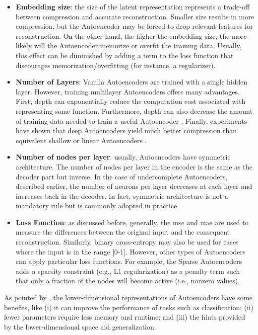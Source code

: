 \begin{itemize}
\item \textbf{Embedding size}: the size of the latent representation represents a trade-off between compression and accurate reconstruction. Smaller size results in more compression, but the Autoencoder may be forced to drop relevant features for reconstruction. On the other hand, the higher the embedding size, the more likely will the Autoencoder memorize or overfit the training data. Usually, this effect can be diminished by adding a term to the loss function that discourages memorization/overfitting (for instance, a regularizer).

\item \textbf{Number of Layers}: Vanilla Autoencoders are trained with a single hidden layer. However, training multilayer Autoencoders offers many advantages. First, depth can exponentially reduce the computation cost associated with representing some function. Furthermore, depth can also decrease the amount of training data needed to train a useful Autoencoder \citep[p.~506]{goodfellow2016deep}. Finally, experiments have shown that deep Autoencoders yield much better compression than equivalent shallow or linear Autoencoders \citep{hinton2006reducing}.

\item \textbf{Number of nodes per layer}: usually, Autoencoders have symmetric architecture. The number of nodes per layer in the encoder is the same as the decoder part but inverse. In the case of undercomplete Autoencoders, described earlier, the number of neurons per layer decreases at each layer and increases back in the decoder. In fact, symmetric architecture is not a mandatory rule but is commonly adopted in practice.

\item \textbf{Loss Function}: as discussed before, generally, the \acs{mse} and \acs{mae} are used to measure the differences between the original input and the consequent reconstruction. Similarly, binary cross-entropy may also be used for cases where the input is in the range [0-1]. However, other types of Autoencoders can apply particular loss functions. For example, the Sparse Autoencoders adds a sparsity constraint (e.g., L1 regularization) as a penalty term such that only a fraction of the nodes will become active (i.e., nonzero values).
\end{itemize}

As pointed by \cite{lecun2015deep}, the lower-dimensional representations of Autoencoders have some benefits, like (i) it can improve the performance of tasks such as classification; (ii) fewer parameters require less memory and runtime; and (iii) the hints provided by the lower-dimensional space aid generalization.

